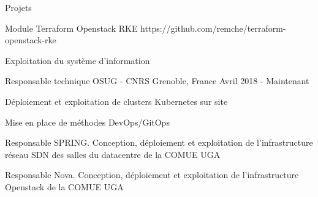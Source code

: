 

\begin{cventries}

  \cventry
    {Projets} %
    {
      \begin{cvitems} %
        \item {Module Terraform Openstack RKE https://github.com/remche/terraform-openstack-rke }
        \item {Exploitation du système d'information}
      \end{cvitems}
    }

  \cventry
    {Responsable technique} %
    {OSUG - CNRS} %
    {Grenoble, France} %
    {Avril 2018 - Maintenant} %
    {
      \begin{cvitems} %
        \item {Déploiement et exploitation de clusters Kubernetes sur site}
        \item {Mise en place de méthodes DevOps/GitOps}
        \item {Responsable SPRING. Conception, déploiement et exploitation de l'infrastructure réseau SDN des salles du datacentre de la COMUE UGA}
        \item {Responsable Nova. Conception, déploiement et exploitation de l'infrastructure Openstack de la COMUE UGA}
      \end{cvitems}
    }


\end{cventries}
